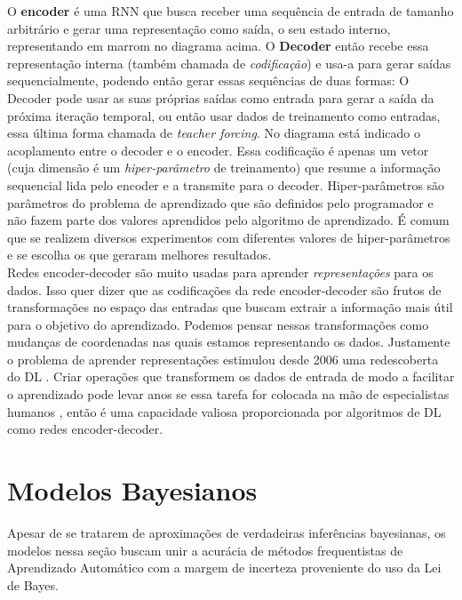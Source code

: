 O \textbf{encoder} é uma RNN que busca receber uma sequência de entrada de
tamanho arbitrário e gerar uma representação como saída, o seu estado interno,
representando em marrom no diagrama acima. O \textbf{Decoder} então recebe essa representação interna (também chamada
de \textit{codificação}) e usa-a para gerar saídas sequencialmente, podendo
então gerar essas sequências de duas formas: O Decoder pode usar as suas próprias saídas
como entrada para gerar a saída da próxima iteração temporal, ou então usar dados de treinamento como
entradas, essa última forma chamada de \textit{teacher forcing}. No diagrama
está indicado o acoplamento entre o decoder e o encoder. Essa codificação é apenas
um vetor (cuja dimensão é um \textit{hiper-parâmetro} de treinamento) que resume a
informação sequencial lida pelo encoder e a transmite para o decoder.
Hiper-parâmetros são parâmetros do problema de aprendizado que são definidos
pelo programador e não fazem parte dos valores aprendidos pelo algoritmo de
aprendizado. É comum que se realizem diversos experimentos com diferentes
valores de hiper-parâmetros e se escolha os que geraram melhores resultados. 
\\

Redes encoder-decoder são muito usadas para aprender \textit{representações} para os
dados. Isso quer dizer que as codificações da rede encoder-decoder são frutos de
transformações no espaço das entradas que buscam extrair a informação mais útil
para o objetivo do aprendizado. Podemos pensar nessas transformações como
mudanças de coordenadas nas quais estamos representando os dados. Justamente o problema de aprender
representações estimulou desde 2006 uma redescoberta do DL \citep{dlbook}. Criar
operações que transformem os dados de entrada de modo a facilitar o aprendizado
pode levar anos se essa tarefa for colocada na mão de especialistas humanos
\citep{dlbook}, então é uma capacidade valiosa proporcionada por algoritmos de
DL como redes encoder-decoder. \\



\section{Modelos Bayesianos}

Apesar de se tratarem de aproximações de verdadeiras inferências bayesianas, os
modelos nessa seção buscam unir a acurácia de métodos frequentistas de
Aprendizado Automático com a
margem de incerteza proveniente do uso da Lei de Bayes.

